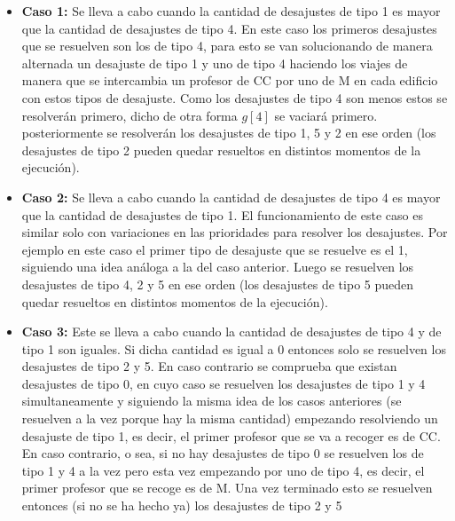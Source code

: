 \documentclass[11pt]{article}
\begin{document}
    \begin{itemize}
        \item \textbf{Caso 1:} Se lleva a cabo cuando la cantidad de desajustes de tipo 1 es mayor que la
              cantidad de desajustes de tipo 4. En este caso los primeros desajustes que se resuelven son los
              de tipo 4, para esto se van solucionando de manera alternada un desajuste de tipo 1 y uno de tipo 4
              haciendo los viajes de manera que se intercambia un profesor de CC por uno de M en cada edificio con
              estos tipos de desajuste. Como los desajustes de tipo 4 son menos estos se resolverán primero, dicho
              de otra forma $g[4]$ se vaciará primero. posteriormente se resolverán los desajustes de tipo 1, 5 y 2
              en ese orden (los desajustes de tipo 2 pueden quedar resueltos en distintos momentos de la ejecución).
        \item \textbf{Caso 2:} Se lleva a cabo cuando la cantidad de desajustes de tipo 4 es mayor que la
              cantidad de desajustes de tipo 1. El funcionamiento de este caso es similar solo con variaciones en
              las prioridades para resolver los desajustes. Por ejemplo en este caso el primer tipo de desajuste que se
              resuelve es el 1, siguiendo una idea análoga a la del caso anterior. Luego se resuelven los
              desajustes de tipo 4, 2 y 5 en ese orden (los desajustes de tipo 5 pueden quedar resueltos en distintos momentos 
              de la ejecución).
        \item \textbf{Caso 3:} Este se lleva a cabo cuando la cantidad de desajustes de tipo 4 y de tipo 1 son iguales.
              Si dicha cantidad es igual a 0 entonces solo se resuelven los desajustes de tipo 2 y 5. En caso contrario
              se comprueba que existan desajustes de tipo 0, en cuyo caso se resuelven los desajustes de tipo 1 y 4
              simultaneamente y siguiendo la misma idea de los casos anteriores (se resuelven a la vez porque hay la misma
              cantidad) empezando resolviendo un desajuste de tipo 1, es decir, el primer profesor que se va a recoger
              es de CC. En caso contrario, o sea, si no hay desajustes de tipo 0 se resuelven los de tipo 1 y 4 a la vez
              pero esta vez empezando por uno de tipo 4, es decir, el primer profesor que se recoge es de M. Una vez
              terminado esto se resuelven entonces (si no se ha hecho ya) los desajustes de tipo 2 y 5
    \end{itemize}
\end{document}
